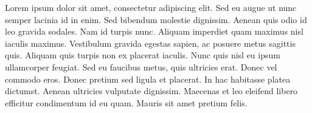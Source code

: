 Lorem ipsum dolor sit amet, consectetur adipiscing elit. 
Sed eu augue ut nunc semper lacinia id in enim. Sed bibendum 
molestie dignissim. Aenean quis odio id leo gravida sodales. 
Nam id turpis nunc. Aliquam imperdiet quam maximus nisl 
iaculis maximus. Vestibulum gravida egestas sapien, ac posuere 
metus sagittis quis. Aliquam quis turpis non ex placerat iaculis. 
Nunc quis nisl eu ipsum ullamcorper feugiat. Sed eu faucibus metus, 
quis ultricies erat. Donec vel commodo eros. Donec pretium sed 
ligula et placerat. In hac habitasse platea dictumst. 
Aenean ultricies vulputate dignissim. Maecenas et leo eleifend 
libero efficitur condimentum id eu quam. Mauris sit amet pretium felis.
